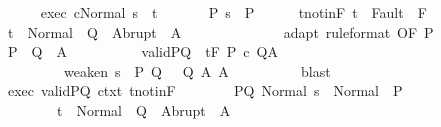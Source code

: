 \begin{isabellebody}
\ \ \ \ \isamarkupfalse%
\ exec{\isacharcolon}\ {\isachardoublequoteopen}{\isasymGamma}{\isasymturnstile}{\isasymlangle}c{\isacharcomma}Normal\ s{\isasymrangle}\ {\isasymRightarrow}\ t{\isachardoublequoteclose}\ \isanewline
\ \ \ \ \isamarkupfalse%
\ P{\isacharcolon}\ {\isachardoublequoteopen}s\ {\isasymin}\ P{\isachardoublequoteclose}\isanewline
\ \ \ \ \isamarkupfalse%
\ t{\isacharunderscore}notin{\isacharunderscore}F{\isacharcolon}\ {\isachardoublequoteopen}t\ {\isasymnotin}\ Fault\ {\isacharbackquote}\ F{\isachardoublequoteclose}\isanewline
\ \ \ \ \isamarkupfalse%
\ {\isachardoublequoteopen}t\ {\isasymin}\ Normal\ {\isacharbackquote}\ Q\ {\isasymunion}\ Abrupt\ {\isacharbackquote}\ A{\isachardoublequoteclose}\isanewline
\ \ \ \ \isamarkupfalse%
\ {\isacharminus}\isanewline
\ \ \ \ \ \ \isamarkupfalse%
\ adapt\ {\isacharbrackleft}rule{\isacharunderscore}format{\isacharcomma}\ OF\ P{\isacharbrackright}\isanewline
\ \ \ \ \ \ \isamarkupfalse%
\ P{\isacharprime}\ \ Q{\isacharprime}\ \ A{\isacharprime}\ \ \isanewline
\ \ \ \ \ \ \ \ valid{\isacharunderscore}P{\isacharprime}{\isacharunderscore}Q{\isacharprime}{\isacharcolon}\ {\isachardoublequoteopen}{\isasymGamma}{\isacharcomma}{\isasymTheta}\ {\isasymTurnstile}\isactrlsub t\isactrlbsub {\isacharslash}F\isactrlesub \ P{\isacharprime}\ c\ Q{\isacharprime}{\isacharcomma}A{\isacharprime}{\isachardoublequoteclose}\isanewline
\ \ \ \ \ \ \ \ \ weaken{\isacharcolon}\ {\isachardoublequoteopen}s\ {\isasymin}\ P{\isacharprime}{\isachardoublequoteclose}\ {\isachardoublequoteopen}Q{\isacharprime}\ {\isasymsubseteq}\ \ Q{\isachardoublequoteclose}\ {\isachardoublequoteopen}A{\isacharprime}{\isasymsubseteq}\ A{\isachardoublequoteclose}\isanewline
\ \ \ \ \ \ \ \ \isamarkupfalse%
\ blast\isanewline
\ \ \ \ \ \ \isamarkupfalse%
\ exec\ valid{\isacharunderscore}P{\isacharprime}{\isacharunderscore}Q{\isacharprime}\ ctxt\ t{\isacharunderscore}notin{\isacharunderscore}F\isanewline
\ \ \ \ \ \ \isamarkupfalse%
\ P{\isacharprime}{\isacharunderscore}Q{\isacharprime}{\isacharcolon}\ {\isachardoublequoteopen}Normal\ s\ {\isasymin}\ Normal\ {\isacharbackquote}\ P{\isacharprime}\ {\isasymlongrightarrow}\ \isanewline
\ \ \ \ \ \ \ \ t\ {\isasymin}\ Normal\ {\isacharbackquote}\ Q{\isacharprime}\ {\isasymunion}\ Abrupt\ {\isacharbackquote}\ A{\isacharprime}{\isachardoublequoteclose}\isanewline
\ \ \ \ \ \ \ \ \isamarkupfalse%

\end{isabellebody}
